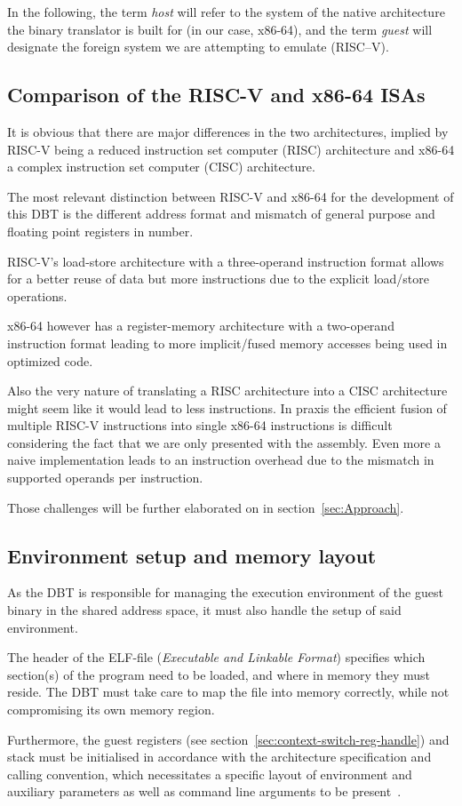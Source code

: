 In the following, the term \textit{host} will refer to the system of the native architecture the binary translator is built for (in our case, x86-64), and the term \textit{guest} will designate the foreign system we are attempting to emulate (RISC--V).

\subsection{Comparison of the RISC-V and x86-64 ISAs}
\label{sec:isa-cmp}
It is obvious that there are major differences in the two architectures, implied by RISC-V being a reduced instruction set computer (RISC) architecture and x86-64 a complex instruction set computer (CISC) architecture.

The most relevant distinction between RISC-V and x86-64 for the development of this DBT is the different address format and mismatch of general purpose and floating point registers in number.

RISC-V's load-store architecture with a three-operand instruction format allows for a better reuse of data but more instructions due to the explicit load/store operations.

x86-64 however has a register-memory architecture with a two-operand instruction format leading to more implicit/fused memory accesses being used in optimized code.

Also the very nature of translating a RISC architecture into a CISC architecture might seem like it would lead to less instructions.
In praxis the efficient fusion of multiple RISC-V instructions into single x86-64 instructions is difficult considering the fact that we are only presented with the assembly.
Even more a naive implementation leads to an instruction overhead due to the mismatch in supported operands per instruction.

Those challenges will be further elaborated on in section~\ref{sec:Approach}.

\subsection{Environment setup and memory layout}
\label{sec:memory-layout}
As the DBT is responsible for managing the execution environment of the guest binary in the shared address space, it must also handle the setup of said environment.

The header of the ELF-file (\textit{Executable and Linkable Format}) specifies which section(s) of the program need to be loaded, and where in memory they must reside.
The DBT must take care to map the file into memory correctly, while not compromising its own memory region.

Furthermore, the guest registers (see section~\vref{sec:context-switch-reg-handle}) and stack must be initialised in accordance with the architecture specification and calling convention, which necessitates a specific layout of environment and auxiliary parameters as well as command line arguments to be present~\cite[S. 2]{bintrans}.

